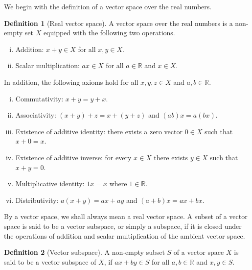 \documentclass[english, 12pt, a4paper, sci, utf8, a-2b, online]{aaltothesis}
\theoremstyle{definition}
\newtheorem{definition}{Definition}[section]
\theoremstyle{plain}
\numberwithin{equation}{section}
\begin{document}
We begin with the definition of a vector space over the real numbers.
\begin{definition}[Real vector space]
    \label{def:vectorspace}
    A vector space over the real numbers is a non-empty set $X$ equipped
    with the following two operations.
    \begin{enumerate}[(i)]
        \item Addition: $x+y \in X$ for all $x,y \in X$.
        \item Scalar multiplication: $a x \in X$ for all $a \in \mathbb{R}$
        and $x \in X$.
    \end{enumerate}
    In addition, the following axioms hold for all $x,y,z \in X$
    and $a,b \in \mathbb{R}$.
    \begin{enumerate}[(i)]
        \item Commutativity: $x+y=y+x$.
        \item Associativity: $(x+y)+z=x+(y+z)$ and $(ab)x=a(bx)$.
        \item Existence of additive identity: there exists a zero vector $0 \in X$
        such that $x+0=x$.
        \item Existence of additive inverse: for every $x \in X$ there exists
        $y \in X$ such that $x+y=0$.
        \item Multiplicative identity: $1x=x$ where $1 \in \mathbb{R}$.
        \item Distributivity: $a(x+y)=ax+ay$ and $(a+b)x=ax+bx$.
    \end{enumerate}
\end{definition}
By a vector space, we shall always mean a real vector space.
A subset of a vector space is said to be a vector subspace,
or simply a subspace, if it is closed under the operations of addition
and scalar multiplication of the ambient vector space.
\begin{definition}[Vector subspace]
    \label{def:subspace}
    A non-empty subset $S$ of a vector space $X$
    is said to be a vector subspace of $X$,
    if $ax+by \in S$ for all $a,b \in \mathbb{R}$ and $x,y \in S$.
\end{definition}
\end{document}
